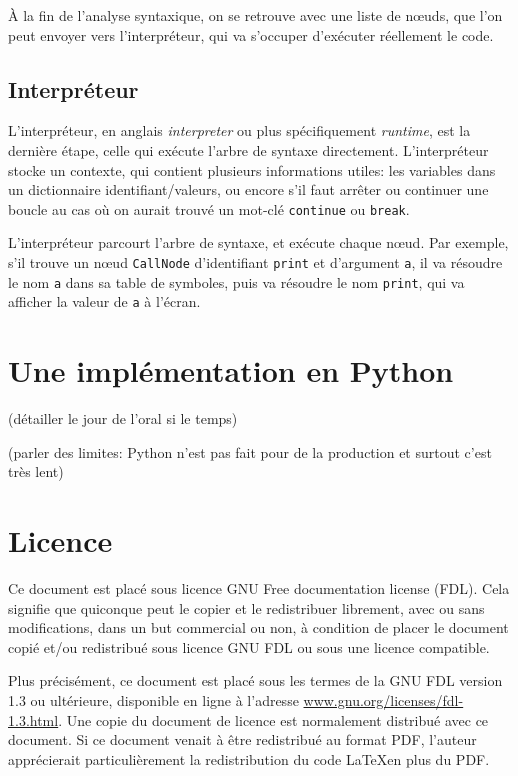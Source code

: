 \documentclass{article}
\begin{document}
À la fin de l’analyse syntaxique, on se retrouve avec une liste de nœuds, que l’on peut envoyer
vers l’interpréteur, qui va s’occuper d’exécuter réellement le code.

\subsection{Interpréteur}
L’interpréteur, en anglais \textit{interpreter} ou plus spécifiquement \textit{runtime}, est la dernière
étape, celle qui exécute l’arbre de syntaxe directement.
L’interpréteur stocke un contexte, qui contient plusieurs informations utiles\nobreakspace:
les variables dans un dictionnaire identifiant/valeurs, ou encore s’il faut arrêter ou continuer
une boucle au cas où on aurait trouvé un mot-clé \verb|continue| ou \verb|break|.

L’interpréteur parcourt l’arbre de syntaxe, et exécute chaque nœud. Par exemple, s’il trouve un
nœud \verb|CallNode| d’identifiant \verb|print| et d’argument \verb|a|, il va résoudre le nom
\verb|a| dans sa table de symboles, puis va résoudre le nom \verb|print|, qui va afficher la 
valeur de \verb|a| à l’écran.

\section{Une implémentation en Python}
(détailler le jour de l’oral si le temps)

(parler des limites\nobreakspace: Python n’est pas fait pour de la production et surtout c’est
très lent)

\printbibliography

\section*{Licence}
Ce document est placé sous licence GNU Free documentation license (FDL).
Cela signifie que quiconque peut le copier et le redistribuer librement, avec ou
sans modifications, dans un but commercial ou non, à condition de placer le
document copié et/ou redistribué sous licence GNU FDL ou sous une licence
compatible.

Plus précisément, ce document est placé sous les termes de la GNU FDL version 1.3 ou
ultérieure, disponible en ligne à l’adresse
\href{www.gnu.org/licenses/fdl-1.3.html}{www.gnu.org/licenses/fdl-1.3.html}.
Une copie du document de licence est normalement distribué avec ce document.
Si ce document venait à être redistribué au format PDF, l’auteur apprécierait
particulièrement la redistribution du code \LaTeX\nobreakspace en plus du PDF.
\end{document}
